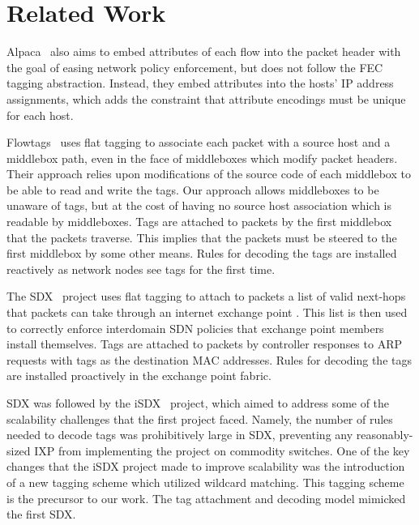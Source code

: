 \section{Related Work} \label{sec:related}
Alpaca~\cite{alpaca} also aims to embed attributes of each flow into the packet header with the goal of easing network policy enforcement, but does not follow the FEC tagging abstraction. Instead, they embed attributes into the hosts' IP address assignments, which adds the constraint that attribute encodings must be unique for each host. 

Flowtags~\cite{flowtags} uses flat tagging to associate each packet with a source host and a middlebox path, even in the face of middleboxes which modify packet headers. Their approach relies upon modifications of the source code of each middlebox to be able to read and write the tags. Our approach allows middleboxes to be unaware of tags, but at the cost of having no source host association which is readable by middleboxes. Tags are attached to packets by the first middlebox that the packets traverse. This implies that the packets must be steered to the first middlebox by some other means. Rules for decoding the tags are installed reactively as network nodes see tags for the first time. 

The SDX~\cite{sdx} project uses flat tagging to attach to packets a list of valid next-hops that packets can take through an internet exchange point . This list is then used to correctly enforce interdomain SDN policies that exchange point members install themselves. Tags are attached to packets by controller responses to ARP requests with tags as the destination MAC addresses. Rules for decoding the tags are installed proactively in the exchange point fabric.

SDX was followed by the iSDX~\cite{isdx} project, which aimed to address some of the scalability challenges that the first project faced. Namely, the number of rules needed to decode tags was prohibitively large in SDX, preventing any reasonably-sized IXP from implementing the project on commodity switches. One of the key changes that the iSDX project made to improve scalability was the introduction of a new tagging scheme which utilized wildcard matching. This tagging scheme is the precursor to our work. The tag attachment and decoding model mimicked the first SDX.